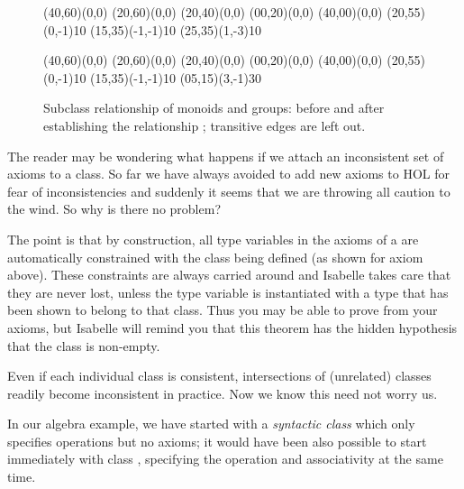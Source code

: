 \begin{isabellebody}
\begin{isamarkuptext}
\begin{figure}[htbp]
 \begin{center}
   \small
   \unitlength 0.6mm
   \begin{picture}(40,60)(0,0)
     \put(20,60){\makebox(0,0){}}
     \put(20,40){\makebox(0,0){}}
     \put(00,20){\makebox(0,0){}}
     \put(40,00){\makebox(0,0){}}
     \put(20,55){\vector(0,-1){10}}
     \put(15,35){\vector(-1,-1){10}}
     \put(25,35){\vector(1,-3){10}}
   \end{picture}
   \hspace{8em}
   \begin{picture}(40,60)(0,0)
     \put(20,60){\makebox(0,0){}}
     \put(20,40){\makebox(0,0){}}
     \put(00,20){\makebox(0,0){}}
     \put(40,00){\makebox(0,0){}}
     \put(20,55){\vector(0,-1){10}}
     \put(15,35){\vector(-1,-1){10}}
     \put(05,15){\vector(3,-1){30}}
   \end{picture}
   \caption{Subclass relationship of monoids and groups:
      before and after establishing the relationship
      ;  transitive edges are left out.}
   \label{fig:subclass}
 \end{center}
\end{figure}%
\end{isamarkuptext}%
\isamarkuptrue%
%
\isamarkuptrue%
%
\begin{isamarkuptext}%
The reader may be wondering what happens if we attach an
inconsistent set of axioms to a class. So far we have always avoided
to add new axioms to HOL for fear of inconsistencies and suddenly it
seems that we are throwing all caution to the wind. So why is there no
problem?

The point is that by construction, all type variables in the axioms of
a  are automatically constrained with the class
being defined (as shown for axiom  above). These
constraints are always carried around and Isabelle takes care that
they are never lost, unless the type variable is instantiated with a
type that has been shown to belong to that class. Thus you may be able
to prove  from your axioms, but Isabelle will remind you
that this theorem has the hidden hypothesis that the class is
non-empty.

Even if each individual class is consistent, intersections of
(unrelated) classes readily become inconsistent in practice. Now we
know this need not worry us.%
\end{isamarkuptext}%
\isamarkuptrue%
%
\isamarkuptrue%
%
\begin{isamarkuptext}%
In our algebra example, we have started with a \emph{syntactic
class}  which only specifies operations but no axioms; it
would have been also possible to start immediately with class , specifying the \isa{{\isasymoplus}} operation and associativity at
the same time.


\end{isamarkuptext}
\end{isabellebody}

